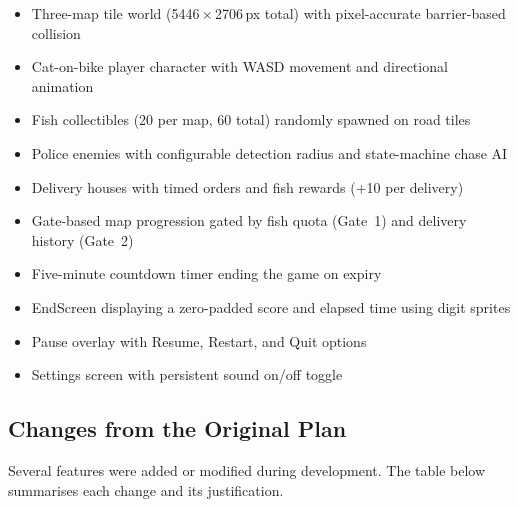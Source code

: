 \documentclass[12pt]{article}
\begin{document}
\begin{itemize}[noitemsep]
    \item Three-map tile world (5446\,$\times$\,2706\,px total) with pixel-accurate barrier-based collision
    \item Cat-on-bike player character with WASD movement and directional animation
    \item Fish collectibles (20 per map, 60 total) randomly spawned on road tiles
    \item Police enemies with configurable detection radius and state-machine chase AI
    \item Delivery houses with timed orders and fish rewards (+10 per delivery)
    \item Gate-based map progression gated by fish quota (Gate~1) and delivery history (Gate~2)
    \item Five-minute countdown timer ending the game on expiry
    \item EndScreen displaying a zero-padded score and elapsed time using digit sprites
    \item Pause overlay with Resume, Restart, and Quit options
    \item Settings screen with persistent sound on/off toggle
\end{itemize}

\subsection{Changes from the Original Plan}

Several features were added or modified during development. The table below summarises each change and its justification.
\end{document}
